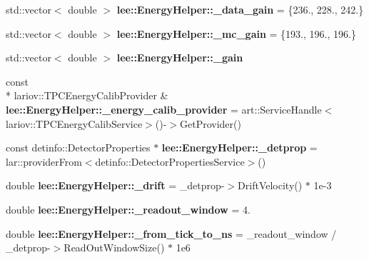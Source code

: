 \begin{DoxyCompactItemize}
\item 
\hypertarget{group__lee_gab80c71d066234aa8f0b483c34a068d55}{std\-::vector$<$ double $>$ {\bfseries lee\-::\-Energy\-Helper\-::\-\_\-data\-\_\-gain} = \{236., 228., 242.\}}\label{group__lee_gab80c71d066234aa8f0b483c34a068d55}

\item 
\hypertarget{group__lee_ga5c5abe13d6a7820e1658a802790f7e80}{std\-::vector$<$ double $>$ {\bfseries lee\-::\-Energy\-Helper\-::\-\_\-mc\-\_\-gain} = \{193., 196., 196.\}}\label{group__lee_ga5c5abe13d6a7820e1658a802790f7e80}

\item 
\hypertarget{group__lee_ga9f16c348e247cda52785e968cfad1b91}{std\-::vector$<$ double $>$ {\bfseries lee\-::\-Energy\-Helper\-::\-\_\-gain}}\label{group__lee_ga9f16c348e247cda52785e968cfad1b91}

\item 
\hypertarget{group__lee_ga4cc0815f3fccf5f704c44fc0a5ed0717}{const \\*
lariov\-::\-T\-P\-C\-Energy\-Calib\-Provider \& {\bfseries lee\-::\-Energy\-Helper\-::\-\_\-energy\-\_\-calib\-\_\-provider} = art\-::\-Service\-Handle$<$lariov\-::\-T\-P\-C\-Energy\-Calib\-Service$>$()-\/$>$Get\-Provider()}\label{group__lee_ga4cc0815f3fccf5f704c44fc0a5ed0717}

\item 
\hypertarget{group__lee_ga5dc96ef9f0d974147c51ca27e46351fa}{const detinfo\-::\-Detector\-Properties $\ast$ {\bfseries lee\-::\-Energy\-Helper\-::\-\_\-detprop} = lar\-::provider\-From$<$detinfo\-::\-Detector\-Properties\-Service$>$()}\label{group__lee_ga5dc96ef9f0d974147c51ca27e46351fa}

\item 
\hypertarget{group__lee_ga5ee65f3a1c672b4f089c05ba6b4ab132}{double {\bfseries lee\-::\-Energy\-Helper\-::\-\_\-drift} = \-\_\-detprop-\/$>$Drift\-Velocity() $\ast$ 1e-\/3}\label{group__lee_ga5ee65f3a1c672b4f089c05ba6b4ab132}

\item 
\hypertarget{group__lee_gad704feff08cf9f09aa46f306e126bbbb}{double {\bfseries lee\-::\-Energy\-Helper\-::\-\_\-readout\-\_\-window} = 4.}\label{group__lee_gad704feff08cf9f09aa46f306e126bbbb}

\item 
\hypertarget{group__lee_ga12d5d0f2b40a3971d57e37b1d176e45d}{double {\bfseries lee\-::\-Energy\-Helper\-::\-\_\-from\-\_\-tick\-\_\-to\-\_\-ns} = \-\_\-readout\-\_\-window / \-\_\-detprop-\/$>$Read\-Out\-Window\-Size() $\ast$ 1e6}\label{group__lee_ga12d5d0f2b40a3971d57e37b1d176e45d}


\end{DoxyCompactItemize}
